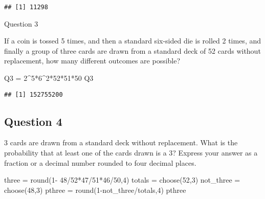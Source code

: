 \documentclass[
]{article}
\newenvironment{Shaded}{\begin{snugshade}}{\end{snugshade}}
\newcommand{\DecValTok}[1]{\textcolor[rgb]{0.00,0.00,0.81}{#1}}
\newcommand{\FunctionTok}[1]{\textcolor[rgb]{0.00,0.00,0.00}{#1}}
\newcommand{\NormalTok}[1]{#1}
\newcommand{\OtherTok}[1]{\textcolor[rgb]{0.56,0.35,0.01}{#1}}
\newcommand{\SpecialCharTok}[1]{\textcolor[rgb]{0.00,0.00,0.00}{#1}}
\begin{document}
\begin{verbatim}
## [1] 11298
\end{verbatim}

Question 3

If a coin is tossed 5 times, and then a standard six-sided die is rolled
2 times, and finally a group of three cards are drawn from a standard
deck of 52 cards without replacement, how many different outcomes are
possible?

\begin{Shaded}
\begin{Highlighting}[]
\NormalTok{Q3 }\OtherTok{=} \DecValTok{2}\SpecialCharTok{\^{}}\DecValTok{5}\SpecialCharTok{*}\DecValTok{6}\SpecialCharTok{\^{}}\DecValTok{2}\SpecialCharTok{*}\DecValTok{52}\SpecialCharTok{*}\DecValTok{51}\SpecialCharTok{*}\DecValTok{50}
\NormalTok{Q3}
\end{Highlighting}
\end{Shaded}

\begin{verbatim}
## [1] 152755200
\end{verbatim}

\hypertarget{question-4}{%
\subsection{Question 4}\label{question-4}}

3 cards are drawn from a standard deck without replacement. What is the
probability that at least one of the cards drawn is a 3? Express your
answer as a fraction or a decimal number rounded to four decimal places.

\begin{Shaded}
\begin{Highlighting}[]
\NormalTok{three }\OtherTok{=} \FunctionTok{round}\NormalTok{(}\DecValTok{1}\SpecialCharTok{{-}} \DecValTok{48}\SpecialCharTok{/}\DecValTok{52}\SpecialCharTok{*}\DecValTok{47}\SpecialCharTok{/}\DecValTok{51}\SpecialCharTok{*}\DecValTok{46}\SpecialCharTok{/}\DecValTok{50}\NormalTok{,}\DecValTok{4}\NormalTok{)}
\NormalTok{totals }\OtherTok{=} \FunctionTok{choose}\NormalTok{(}\DecValTok{52}\NormalTok{,}\DecValTok{3}\NormalTok{)}
\NormalTok{not\_three }\OtherTok{=} \FunctionTok{choose}\NormalTok{(}\DecValTok{48}\NormalTok{,}\DecValTok{3}\NormalTok{)}
\NormalTok{pthree }\OtherTok{=} \FunctionTok{round}\NormalTok{(}\DecValTok{1}\SpecialCharTok{{-}}\NormalTok{not\_three}\SpecialCharTok{/}\NormalTok{totals,}\DecValTok{4}\NormalTok{)}
\NormalTok{pthree}
\end{Highlighting}
\end{Shaded}
\end{document}
